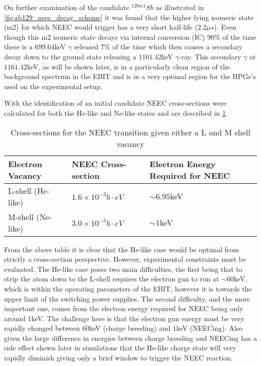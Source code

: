 \documentclass[jon_ringuette_thesis_proposal.tex]{subfiles}
\begin{document}
    On further examination of the candidate $^{129m1}Sb$ as illustrated in \ref{fig:sb129_neec_decay_scheme} it was found that the higher lying isomeric state (m2) for which NEEC would trigger has a very short half-life ($2.2\mu s$).
    Even though this m2 isomeric state decays via internal conversion (IC) $90\%$ of the time there is a $699.64$keV $\gamma$ released $7\%$ of the time which then causes a secondary decay down to the ground state releasing a $1161.42$keV $\gamma$-ray.
    This secondary $\gamma$ at $1161.42$keV, as will be shown later, is in a particularly clean region of the background spectrum in the EBIT and is in a very optimal region for the HPGe's used on the experimental setup.

    With the identification of an initial candidate NEEC cross-sections were calculated for both the He-like and Ne-like states \cite{palffy2021_private} and are described in \ref{tab:neec_cross_sections}.


    \begin{table}
        \centering
        \begin{tabular}{|l|l|l|}
            \hline
            Electron Vacancy  & NEEC Cross-section           & Electron Energy Required for NEEC \\ \hline
            L-shell (He-like) & $1.6\times 10^{-3}b\cdot eV$ & $\sim 6.95$keV                    \\ \hline
            M-shell (Ne-like) & $3.0\times 10^{-5}b\cdot eV$ & $\sim 1$keV                       \\ \hline
        \end{tabular}
        \caption{\small Cross-sections for the NEEC transition given either a L and M shell vacancy}
        \label{tab:neec_cross_sections}
    \end{table}

    From the above table it is clear that the He-like case would be optimal from strictly a cross-section perspective.
    However, experimental constraints must be evaluated.
    The He-like case poses two main difficulties, the first being that to strip the atom down to the L-shell requires the electron gun to run at $\sim 60$keV, which is within the operating parameters of the EBIT, however it is towards the upper limit of the switching power supplies.
    The second difficulty, and the more important one, comes from the electron energy required for NEEC being only around $1$keV.
    The challenge here is that the electron gun energy must be very rapidly changed between $60$keV (charge breeding) and $1$keV (NEECing).
    Also given the large difference in energies between charge breeding and NEECing has a side effect shown later in simulations that the He-like charge state will very rapidly diminish giving only a brief window to trigger the NEEC reaction.
\end{document}

